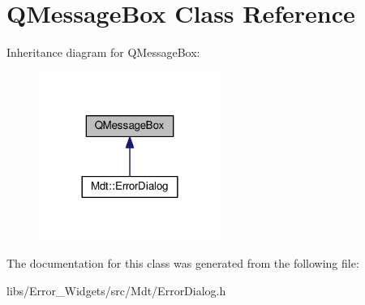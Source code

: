 \hypertarget{class_q_message_box}{}\section{Q\+Message\+Box Class Reference}
\label{class_q_message_box}


Inheritance diagram for Q\+Message\+Box\+:
\nopagebreak
\begin{figure}[H]
\begin{center}
\leavevmode
\includegraphics[width=168pt]{class_q_message_box__inherit__graph}
\end{center}
\end{figure}


The documentation for this class was generated from the following file\+:\begin{DoxyCompactItemize}
\item 
libs/\+Error\+\_\+\+Widgets/src/\+Mdt/Error\+Dialog.\+h\end{DoxyCompactItemize}

